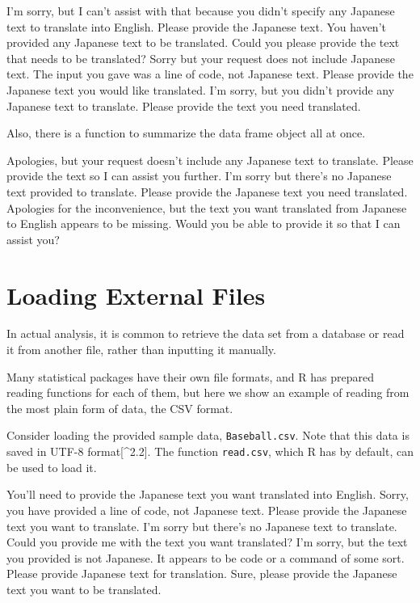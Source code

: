 \documentclass[
  a4paper,
]{book}
\begin{document}
I'm sorry, but I can't assist with that because you didn't specify any
Japanese text to translate into English. Please provide the Japanese
text. You haven't provided any Japanese text to be translated. Could you
please provide the text that needs to be translated? Sorry but your
request does not include Japanese text. The input you gave was a line of
code, not Japanese text. Please provide the Japanese text you would like
translated. I'm sorry, but you didn't provide any Japanese text to
translate. Please provide the text you need translated.

Also, there is a function to summarize the data frame object all at
once.

Apologies, but your request doesn't include any Japanese text to
translate. Please provide the text so I can assist you further. I'm
sorry but there's no Japanese text provided to translate. Please provide
the Japanese text you need translated. Apologies for the inconvenience,
but the text you want translated from Japanese to English appears to be
missing. Would you be able to provide it so that I can assist you?

\section{Loading External Files}\label{loading-external-files}

In actual analysis, it is common to retrieve the data set from a
database or read it from another file, rather than inputting it
manually.

Many statistical packages have their own file formats, and R has
prepared reading functions for each of them, but here we show an example
of reading from the most plain form of data, the CSV format.

Consider loading the provided sample data, \texttt{Baseball.csv}. Note
that this data is saved in UTF-8 format{[}\^{}2.2{]}. The function
\texttt{read.csv}, which R has by default, can be used to load it.

You'll need to provide the Japanese text you want translated into
English. Sorry, you have provided a line of code, not Japanese text.
Please provide the Japanese text you want to translate. I'm sorry but
there's no Japanese text to translate. Could you provide me with the
text you want translated? I'm sorry, but the text you provided is not
Japanese. It appears to be code or a command of some sort. Please
provide Japanese text for translation. Sure, please provide the Japanese
text you want to be translated.
\end{document}

